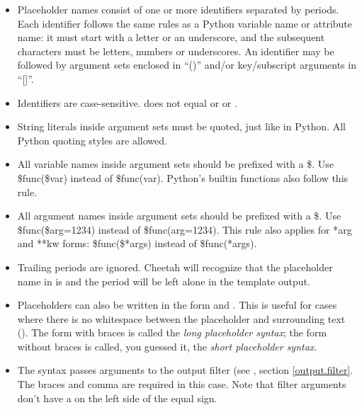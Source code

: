 \begin{itemize} 
     
\item Placeholder names consist of one or more identifiers separated by periods.
     Each identifier follows the same rules as a Python variable name or
     attribute name: it must start with a letter or an underscore, and the
     subsequent characters must be letters, numbers or underscores.  An
     identifier may be followed by argument sets enclosed in ``()'' and/or
     key/subscript arguments in ``[]''.

\item Identifiers are case-sensitive.  does not equal 
     or  or .     
     
\item String literals inside argument sets must be quoted, just like in Python.
     All Python quoting styles are allowed.
     
\item All variable names inside argument sets should be prefixed with a \$.
     Use \$func(\$var) instead of \$func(var).  Python's builtin functions also
     follow this rule.

\item All argument names inside argument sets should be prefixed with a \$.
     Use \$func(\$arg=1234) instead of \$func(arg=1234).  This rule also applies
     for *arg and **kw forms: \$func(\$*args) instead of \$func(*args).
    
\item Trailing periods are ignored.  Cheetah will recognize that the placeholder
     name in  is  and the period will be left
     alone in the template output.
     
\item Placeholders can also be written in the form 
     and .  This is useful for cases where there is no
     whitespace between the placeholder and surrounding text
     ().  The form with braces is called
     the {\em long placeholder syntax}; the form without braces is called, you
     guessed it, the {\em short placeholder syntax}.

\item The syntax  passes arguments to
     the output filter (see , section \ref{output.filter}.
     The braces and comma are required in this case.  Note that filter arguments
     don't have a \code{\$} on the left side of the equal sign.


\end{itemize}
